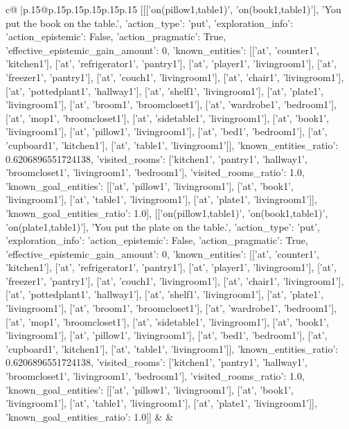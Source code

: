 \documentclass{article}
\begin{document}
{\begin{supertabular}{c@{$\;$}|p{.15\linewidth}@{}p{.15\linewidth}p{.15\linewidth}p{.15\linewidth}p{.15\linewidth}p{.15\linewidth}}
{{{	 [[['on(pillow1,table1)', 'on(book1,table1)'], 'You put the book on the table.', {'action_type': 'put', 'exploration_info': {'action_epistemic': False, 'action_pragmatic': True, 'effective_epistemic_gain_amount': 0, 'known_entities': [['at', 'counter1', 'kitchen1'], ['at', 'refrigerator1', 'pantry1'], ['at', 'player1', 'livingroom1'], ['at', 'freezer1', 'pantry1'], ['at', 'couch1', 'livingroom1'], ['at', 'chair1', 'livingroom1'], ['at', 'pottedplant1', 'hallway1'], ['at', 'shelf1', 'livingroom1'], ['at', 'plate1', 'livingroom1'], ['at', 'broom1', 'broomcloset1'], ['at', 'wardrobe1', 'bedroom1'], ['at', 'mop1', 'broomcloset1'], ['at', 'sidetable1', 'livingroom1'], ['at', 'book1', 'livingroom1'], ['at', 'pillow1', 'livingroom1'], ['at', 'bed1', 'bedroom1'], ['at', 'cupboard1', 'kitchen1'], ['at', 'table1', 'livingroom1']], 'known_entities_ratio': 0.6206896551724138, 'visited_rooms': ['kitchen1', 'pantry1', 'hallway1', 'broomcloset1', 'livingroom1', 'bedroom1'], 'visited_rooms_ratio': 1.0, 'known_goal_entities': [['at', 'pillow1', 'livingroom1'], ['at', 'book1', 'livingroom1'], ['at', 'table1', 'livingroom1'], ['at', 'plate1', 'livingroom1']], 'known_goal_entities_ratio': 1.0}}], [['on(pillow1,table1)', 'on(book1,table1)', 'on(plate1,table1)'], 'You put the plate on the table.', {'action_type': 'put', 'exploration_info': {'action_epistemic': False, 'action_pragmatic': True, 'effective_epistemic_gain_amount': 0, 'known_entities': [['at', 'counter1', 'kitchen1'], ['at', 'refrigerator1', 'pantry1'], ['at', 'player1', 'livingroom1'], ['at', 'freezer1', 'pantry1'], ['at', 'couch1', 'livingroom1'], ['at', 'chair1', 'livingroom1'], ['at', 'pottedplant1', 'hallway1'], ['at', 'shelf1', 'livingroom1'], ['at', 'plate1', 'livingroom1'], ['at', 'broom1', 'broomcloset1'], ['at', 'wardrobe1', 'bedroom1'], ['at', 'mop1', 'broomcloset1'], ['at', 'sidetable1', 'livingroom1'], ['at', 'book1', 'livingroom1'], ['at', 'pillow1', 'livingroom1'], ['at', 'bed1', 'bedroom1'], ['at', 'cupboard1', 'kitchen1'], ['at', 'table1', 'livingroom1']], 'known_entities_ratio': 0.6206896551724138, 'visited_rooms': ['kitchen1', 'pantry1', 'hallway1', 'broomcloset1', 'livingroom1', 'bedroom1'], 'visited_rooms_ratio': 1.0, 'known_goal_entities': [['at', 'pillow1', 'livingroom1'], ['at', 'book1', 'livingroom1'], ['at', 'table1', 'livingroom1'], ['at', 'plate1', 'livingroom1']], 'known_goal_entities_ratio': 1.0}}]] 
	  } 
	   } 
	   } 
	 & & \\ 
 

    \theutterance {}  


\end{supertabular}}
\end{document}
